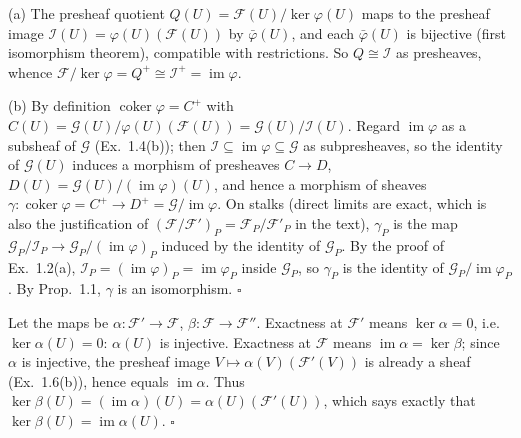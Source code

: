 \documentclass[11pt]{article}
\begin{document}
\pf
(a) The presheaf quotient $Q(U)=\mathcal F(U)/\ker\varphi(U)$ maps to the presheaf image $\mathcal I(U)=\varphi(U)(\mathcal F(U))$ by $\bar\varphi(U)$, and each $\bar\varphi(U)$ is bijective (first isomorphism theorem), compatible with restrictions. So $Q\cong\mathcal I$ as presheaves, whence $\mathcal F/\ker\varphi=Q^+\cong\mathcal I^+=\operatorname{im}\varphi$.

(b) By definition $\operatorname{coker}\varphi=C^+$ with $C(U)=\mathcal G(U)/\varphi(U)(\mathcal F(U))=\mathcal G(U)/\mathcal I(U)$. Regard $\operatorname{im}\varphi$ as a subsheaf of $\mathcal G$ (Ex.~1.4(b)); then $\mathcal I\subseteq\operatorname{im}\varphi\subseteq\mathcal G$ as subpresheaves, so the identity of $\mathcal G(U)$ induces a morphism of presheaves $C\to D$, $D(U)=\mathcal G(U)/(\operatorname{im}\varphi)(U)$, and hence a morphism of sheaves $\gamma\colon\operatorname{coker}\varphi=C^+\to D^+=\mathcal G/\operatorname{im}\varphi$. On stalks (direct limits are exact, which is also the justification of $(\mathcal F/\mathcal F')_P=\mathcal F_P/\mathcal F'_P$ in the text), $\gamma_P$ is the map $\mathcal G_P/\mathcal I_P\to\mathcal G_P/(\operatorname{im}\varphi)_P$ induced by the identity of $\mathcal G_P$. By the proof of Ex.~1.2(a), $\mathcal I_P=(\operatorname{im}\varphi)_P=\operatorname{im}\varphi_P$ inside $\mathcal G_P$, so $\gamma_P$ is the identity of $\mathcal G_P/\operatorname{im}\varphi_P$. By Prop.~1.1, $\gamma$ is an isomorphism. \hfill$\square$

\pf
Let the maps be $\alpha\colon\mathcal F'\to\mathcal F$, $\beta\colon\mathcal F\to\mathcal F''$. Exactness at $\mathcal F'$ means $\ker\alpha=0$, i.e.\ $\ker\alpha(U)=0$: $\alpha(U)$ is injective. Exactness at $\mathcal F$ means $\operatorname{im}\alpha=\ker\beta$; since $\alpha$ is injective, the presheaf image $V\mapsto\alpha(V)(\mathcal F'(V))$ is already a sheaf (Ex.~1.6(b)), hence equals $\operatorname{im}\alpha$. Thus $\ker\beta(U)=(\operatorname{im}\alpha)(U)=\alpha(U)(\mathcal F'(U))$, which says exactly that $\ker\beta(U)=\operatorname{im}\alpha(U)$. \hfill$\square$
\end{document}
